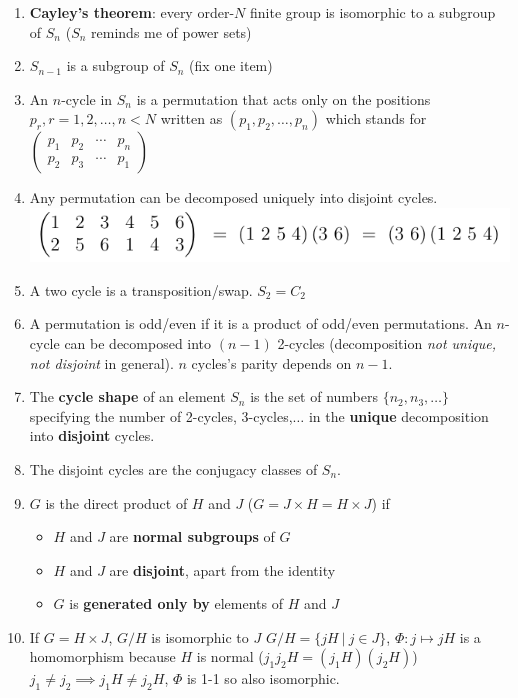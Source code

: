 \documentclass{article}
\theoremstyle{remark}
\theoremstyle{remark}
\begin{document}
\begin{enumerate}
        \item \textbf{Cayley's theorem}: every order-$N$ finite group is isomorphic to a subgroup of $S_n$ ($S_n$ reminds me of power sets)
        \item $S_{n-1}$ is a subgroup of $S_n$ (fix one item)
        \item An $n$-cycle in $S_n$ is a permutation that acts only on the positions $p_r,r=1,2,\ldots,n<N$ written as $(p_1,p_2,\ldots,p_n)$ which stands for $\begin{pmatrix}
                p_1 & p_2 & \cdots & p_n\\
                p_2 & p_3 & \cdots & p_1
            \end{pmatrix}$
        \item Any permutation can be decomposed uniquely into disjoint cycles.\newline
            \includegraphics*[width=0.6\linewidth]{permutation_example.png}
        \item A two cycle is a transposition/swap. $S_2=C_2$
        \item A permutation is odd/even if it is a product of odd/even permutations. An $n$-cycle can be decomposed into $(n-1)$ 2-cycles (decomposition \emph{not unique, not disjoint} in general). $n$ cycles's parity depends on $n-1$.
        \item The \textbf{cycle shape} of an element $S_n$ is the set of numbers $\{n_2,n_3,\ldots\}$ specifying the number of 2-cycles, 3-cycles,$\ldots$ in the \textbf{unique} decomposition into \textbf{disjoint} cycles.
        \item The disjoint cycles are the conjugacy classes of $S_n$.
        \item $G$ is the direct product of $H$ and $J$ ($G=J\times H=H\times J$) if\begin{itemize}
                \item $H$ and $J$ are \textbf{normal subgroups} of $G$
                \item $H$ and $J$ are \textbf{disjoint}, apart from the identity
                \item $G$ is \textbf{generated only by} elements of $H$ and $J$
            \end{itemize}
        \item If $G=H\times J$, $G/H$ is isomorphic to $J$\newline
                $G/H=\{jH\ |\ j\in J\}$, $\Phi:j\mapsto jH$ is a homomorphism because $H$ is normal ($j_1j_2H=(j_1H)(j_2H)$)\newline
                $j_1\neq j_2\implies j_1H\neq j_2H$, $\Phi$ is 1-1 so also isomorphic.
    \end{enumerate}
\end{document}
